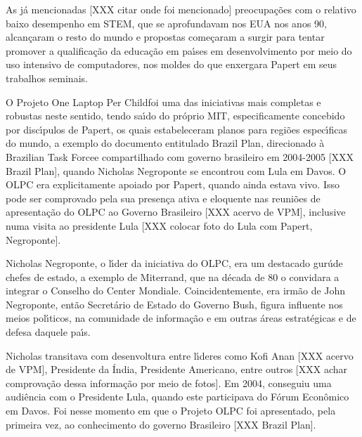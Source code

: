 \documentclass[
12pt,		%
openright,	%
twoside,  %
a4paper,			%
chapter=TITLE,		%
english,			%
french,				%
spanish,			%
brazil				%
]{USPSC-classe/USPSC_RedarTex}
\begin{document}
As j\'a mencionadas [XXX citar onde foi mencionado] preocupa\c{c}\~oes com o relativo baixo desempenho em STEM, que se aprofundavam nos EUA nos anos 90, alcan\c{c}aram o resto do mundo e propostas come\c{c}aram a surgir para tentar promover a qualifica\c{c}\~ao da educa\c{c}\~ao em pa\'{\i}ses em desenvolvimento por meio do uso intensivo de computadores, nos moldes do que enxergara Papert em seus trabalhos seminais.










O Projeto \textquotedbl One Laptop Per Child foi uma das iniciativas mais completas e robustas neste sentido, tendo sa\'{\i}do  do pr\'oprio MIT, especificamente concebido por disc\'{\i}pulos de Papert, os quais estabeleceram planos para regi\~oes espec\'{\i}ficas do mundo, a exemplo do documento entitulado \textquotedbl Brazil Plan\textquotedbl , direcionado \`a \textquotedbl Brazilian Task Force\textquotedbl  e compartilhado com governo brasileiro em 2004-2005 [XXX Brazil Plan], quando Nicholas Negroponte se encontrou com Lula em Davos. O OLPC era explicitamente apoiado por Papert, quando ainda estava vivo. Isso pode ser comprovado pela sua presen\c{c}a ativa e eloquente nas reuni\~oes de apresenta\c{c}\~ao do OLPC ao Governo Brasileiro [XXX acervo de VPM], inclusive numa visita ao presidente Lula [XXX colocar foto do Lula com Papert, Negroponte].










Nicholas Negroponte, o l\'{\i}der da iniciativa do OLPC, era um destacado \textquotedbl gur\'u\textquotedbl  de chefes de estado, a exemplo de Miterrand, que na d\'ecada de 80 o convidara a integrar o Conselho do \textquotedbl Center Mondiale. Coincidentemente, era irm\~ao de John Negroponte, ent\~ao Secret\'ario de Estado do Governo Bush, figura influente nos meios pol\'{\i}ticos, na comunidade de informa\c{c}\~ao e em outras \'areas estrat\'egicas e de defesa daquele pa\'{\i}s.










Nicholas transitava com desenvoltura entre l\'{\i}deres como Kofi Anan [XXX acervo de VPM], Presidente da \'India, Presidente Americano, entre outros [XXX achar comprova\c{c}\~ao dessa informa\c{c}\~ao por meio de fotos]. Em 2004, conseguiu uma audi\^encia com o Presidente Lula, quando este participava do F\'orum  Econ\^omico  em Davos. Foi nesse momento em que o Projeto OLPC foi apresentado, pela primeira vez, ao conhecimento do governo Brasileiro [XXX Brazil Plan].
\end{document}
